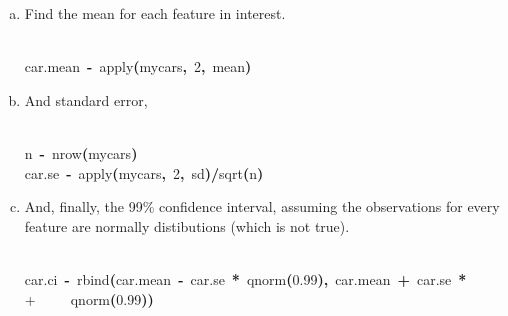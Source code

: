 \documentclass{article}
\newcommand{\hlnumber}[1]{\textcolor[rgb]{0.0823529411764706,0.0784313725490196,0.709803921568627}{#1}}%
\newcommand{\hlfunctioncall}[1]{\textcolor[rgb]{1,0,0}{#1}}%
\newcommand{\hlkeyword}[1]{\textcolor[rgb]{0,0,0}{\textbf{#1}}}%
\newcommand{\hlassignement}[1]{\textcolor[rgb]{0.215686274509804,0.215686274509804,0.384313725490196}{\textbf{#1}}}%
\newcommand{\hlsymbol}[1]{\textcolor[rgb]{0,0,0}{#1}}%
\newcommand{\hlprompt}[1]{\textcolor[rgb]{0,0,0}{#1}}%
\newcommand{\hlstd}[1]{\textcolor[rgb]{0,0,0}{#1}}%
\newenvironment{Houtput}{\raggedright}{%
%
}
\begin{document}
    \begin{enumerate}[(a)]
        \item Find the mean for each feature in interest.
\begin{Houtput}
\hspace*{\fill}\\
\hlstd{}\ttfamily\noindent
\hlprompt{\usebox{\hlnormalsizeboxgreaterthan}{\ }}\hlsymbol{car.mean}{\ }\hlassignement{\usebox{\hlnormalsizeboxlessthan}-}{\ }\hlfunctioncall{apply}\hlkeyword{(}\hlsymbol{mycars}\hlkeyword{,}{\ }\hlnumber{2}\hlkeyword{,}{\ }\hlsymbol{mean}\hlkeyword{)}\mbox{}
\normalfont
\hspace*{\fill}\\
\hlstd{}
\end{Houtput}
        \item And standard error,
\begin{Houtput}
\hspace*{\fill}\\
\hlstd{}\ttfamily\noindent
\hlprompt{\usebox{\hlnormalsizeboxgreaterthan}{\ }}\hlsymbol{n}{\ }\hlassignement{\usebox{\hlnormalsizeboxlessthan}-}{\ }\hlfunctioncall{nrow}\hlkeyword{(}\hlsymbol{mycars}\hlkeyword{)}\mbox{}
\normalfont
\hspace*{\fill}\\
\hlstd{}\ttfamily\noindent
\hlprompt{\usebox{\hlnormalsizeboxgreaterthan}{\ }}\hlsymbol{car.se}{\ }\hlassignement{\usebox{\hlnormalsizeboxlessthan}-}{\ }\hlfunctioncall{apply}\hlkeyword{(}\hlsymbol{mycars}\hlkeyword{,}{\ }\hlnumber{2}\hlkeyword{,}{\ }\hlsymbol{sd}\hlkeyword{)}\hlkeyword{/}\hlfunctioncall{sqrt}\hlkeyword{(}\hlsymbol{n}\hlkeyword{)}\mbox{}
\normalfont
\hspace*{\fill}\\
\hlstd{}
\end{Houtput}
        \item And, finally, the 99\% confidence interval, assuming the observations for every feature are normally distibutions (which is not true).
\begin{Houtput}
\hspace*{\fill}\\
\hlstd{}\ttfamily\noindent
\hlprompt{\usebox{\hlnormalsizeboxgreaterthan}{\ }}\hlsymbol{car.ci}{\ }\hlassignement{\usebox{\hlnormalsizeboxlessthan}-}{\ }\hlfunctioncall{rbind}\hlkeyword{(}\hlsymbol{car.mean}{\ }\hlkeyword{-}{\ }\hlsymbol{car.se}{\ }\hlkeyword{*}{\ }\hlfunctioncall{qnorm}\hlkeyword{(}\hlnumber{0.99}\hlkeyword{)}\hlkeyword{,}{\ }\hlsymbol{car.mean}{\ }\hlkeyword{+}{\ }\hlsymbol{car.se}{\ }\hlkeyword{*}\hspace*{\fill}\\
\hlstd{}\hlprompt{+{\ }}{\ }{\ }{\ }{\ }\hlfunctioncall{qnorm}\hlkeyword{(}\hlnumber{0.99}\hlkeyword{)}\hlkeyword{)}\mbox{}
\normalfont
\hspace*{\fill}\\
\hlstd{}
\end{Houtput}
    \end{enumerate}
\end{document}
